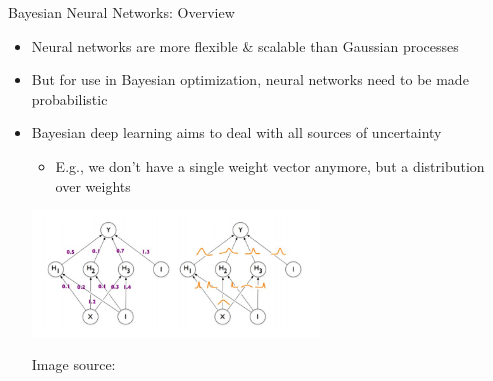 \begin{frame}[c]{Bayesian Neural Networks: Overview}

\begin{itemize}
    \item Neural networks are more flexible \& scalable than Gaussian processes 
    \item But for use in Bayesian optimization, neural networks need to be made probabilistic
    
\pause
    \item Bayesian deep learning aims to deal with all sources of uncertainty \pause
    \begin{itemize}
        \item E.g., we don't have a single weight vector anymore, but a distribution over weights
    \end{itemize}

\centering
\includegraphics[width=0.6\textwidth]{images/surrogate_models/bnn.jpg}

\footnotesize{Image source: }

\end{itemize}



\end{frame}
%
%

